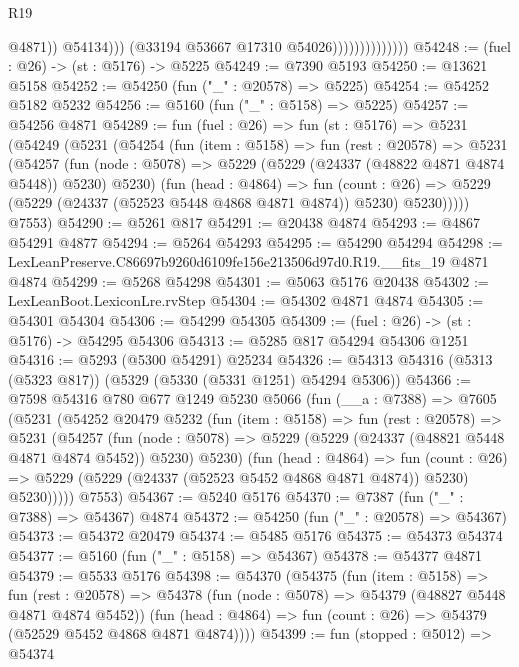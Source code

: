 \begin{lexlean}{R19}
\begin{coremodule}
                                        @4871))
                                    @54134)))
                              (@33194 @53667 @17310 @54026))))))))))))))
@54248 := (fuel : @26) -> (st : @5176) -> @5225
@54249 := @7390 @5193
@54250 := @13621 @5158
@54252 := @54250 (fun ("_" : @20578) => @5225)
@54254 := @54252 @5182 @5232
@54256 := @5160 (fun ("_" : @5158) => @5225)
@54257 := @54256 @4871
@54289 := fun (fuel : @26) =>
  fun (st : @5176) =>
  @5231
    (@54249
      (@5231
        (@54254
          (fun (item : @5158) =>
          fun (rest : @20578) =>
          @5231
            (@54257
              (fun (node : @5078) => @5229 (@5229 (@24337 (@48822 @4871 @4874 @5448)) @5230) @5230)
              (fun (head : @4864) =>
              fun (count : @26) =>
              @5229 (@5229 (@24337 (@52523 @5448 @4868 @4871 @4874)) @5230) @5230)))))
      @7553)
@54290 := @5261 @817
@54291 := @20438 @4874
@54293 := @4867 @54291 @4877
@54294 := @5264 @54293
@54295 := @54290 @54294
@54298 := LexLeanPreserve.C86697b9260d6109fe156e213506d97d0.R19.__fits_19 @4871 @4874
@54299 := @5268 @54298
@54301 := @5063 @5176 @20438
@54302 := LexLeanBoot.LexiconLre.rvStep
@54304 := @54302 @4871 @4874
@54305 := @54301 @54304
@54306 := @54299 @54305
@54309 := (fuel : @26) -> (st : @5176) -> @54295 @54306
@54313 := @5285 @817 @54294 @54306 @1251
@54316 := @5293 (@5300 @54291) @25234
@54326 := @54313 @54316 (@5313 (@5323 @817)) (@5329 (@5330 (@5331 @1251) @54294 @5306))
@54366 := @7598
    @54316
    @780
    @677
    @1249
    @5230
    @5066
    (fun (__a : @7388) =>
    @7605
      (@5231
        (@54252
          @20479
          @5232
          (fun (item : @5158) =>
          fun (rest : @20578) =>
          @5231
            (@54257
              (fun (node : @5078) =>
              @5229 (@5229 (@24337 (@48821 @5448 @4871 @4874 @5452)) @5230) @5230)
              (fun (head : @4864) =>
              fun (count : @26) =>
              @5229 (@5229 (@24337 (@52523 @5452 @4868 @4871 @4874)) @5230) @5230)))))
      @7553)
@54367 := @5240 @5176
@54370 := @7387 (fun ("_" : @7388) => @54367) @4874
@54372 := @54250 (fun ("_" : @20578) => @54367)
@54373 := @54372 @20479
@54374 := @5485 @5176
@54375 := @54373 @54374
@54377 := @5160 (fun ("_" : @5158) => @54367)
@54378 := @54377 @4871
@54379 := @5533 @5176
@54398 := @54370
    (@54375
      (fun (item : @5158) =>
      fun (rest : @20578) =>
      @54378
        (fun (node : @5078) => @54379 (@48827 @5448 @4871 @4874 @5452))
        (fun (head : @4864) => fun (count : @26) => @54379 (@52529 @5452 @4868 @4871 @4874))))
@54399 := fun (stopped : @5012) => @54374

\end{coremodule}
\end{lexlean}
